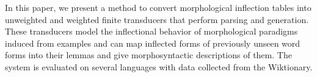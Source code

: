 In this paper, we present a method to convert morphological inflection tables into unweighted and weighted finite transducers that perform parsing and generation.  These transducers model the inflectional behavior of morphological paradigms induced from examples and can map inflected forms of previously unseen word forms into their lemmas and give morphosyntactic descriptions of them.  The system is evaluated on several languages with data collected from the Wiktionary.
